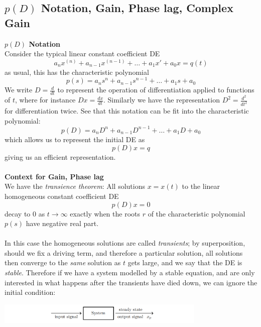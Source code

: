 \documentclass{report}
\begin{document}
\subsection{$p(D)$ Notation, Gain, Phase lag, Complex Gain}
\textbf{$p(D)$ Notation}\\
Consider the typical linear constant coefficient DE
\begin{equation*}
a_nx^{(n)}+a_{n-1}x^{(n-1)}+\ldots+a_1x'+a_0x=q(t)
\end{equation*}
as usual, this has the characteristic polynomial
\begin{equation*}
p(s)=a_ns^n+a_{n-1}s^{n-1}+\ldots+a_1s+a_0
\end{equation*}
We write $D=\frac{d}{dt}$ to represent the operation of differentiation applied to functions of $t$, 
where for instance $Dx=\frac{dx}{dt}$. Similarly
we have the representation $D^2=\frac{d^2}{dt^2}$ for differentiation twice. See that this notation can be fit
into the characteristic polynomial:
\begin{equation*}
p(D)=a_nD^n+a_{n-1}D^{n-1}+\ldots+a_1D+a_0
\end{equation*}
which allows us to represent the initial DE as
\begin{equation*}
p(D)x=q
\end{equation*}
giving us an efficient representation.\\
\vspace{1mm}\\
\textbf{Context for Gain, Phase lag}\\
We have the \textit{transience theorem}: All solutions $x=x(t)$ to the linear homogeneous constant coefficient DE
\begin{equation*}
p(D)x=0
\end{equation*}
decay to 0 as $t\to\infty$ exactly when the roots $r$ of the characteristic polynomial $p(s)$ have negative
real part.\\
\vspace{1mm}\\
In this case the homogeneous solutions are called \textit{transients}; by superposition, 
should we fix a driving term, and therefore a particular solution, all solutions then converge to the 
\textit{same} solution as $t$ gets large, and we say that
the DE is \textit{stable}. Therefore if we have a system modelled by a stable equation, and are only interested in
what happens after the transients have died down, we can ignore the initial condition:
\begin{center}
\includegraphics[width=10cm]{32}\\
\end{center}
\end{document}
